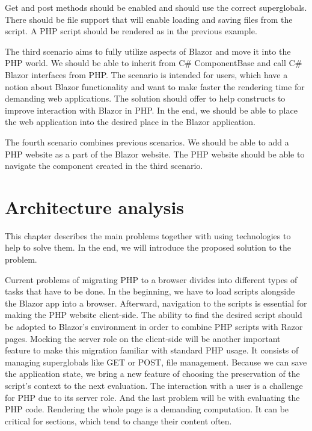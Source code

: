 Get and post methods should be enabled and should use the correct superglobals.
There should be file support that will enable loading and saving files from the script.
A PHP script should be rendered as in the previous example.
\par
The third scenario aims to fully utilize aspects of Blazor and move it into the PHP world.
We should be able to inherit from C\# ComponentBase and call C\# Blazor interfaces from PHP.
The scenario is intended for users, which have a notion about Blazor functionality and want to make faster the rendering time for demanding web applications.
The solution should offer to help constructs to improve interaction with Blazor in PHP.
In the end, we should be able to place the web application into the desired place in the Blazor application.
\par
The fourth scenario combines previous scenarios.
We should be able to add a PHP website as a part of the Blazor website.
The PHP website should be able to navigate the component created in the third scenario.

\section{Architecture analysis}










This chapter describes the main problems together with using technologies to help to solve them.
In the end, we will introduce the proposed solution to the problem.

Current problems of migrating PHP to a browser divides into different types of tasks that have to be done.
In the beginning, we have to load scripts alongside the Blazor app into a browser. 
Afterward, navigation to the scripts is essential for making the PHP website client-side.
The ability to find the desired script should be adopted to Blazor's environment in order to combine PHP scripts with Razor pages.
Mocking the server role on the client-side will be another important feature to make this migration familiar with standard PHP usage.
It consists of managing superglobals like GET or POST, file management.
Because we can save the application state, we bring a new feature of choosing the preservation of the script's context to the next evaluation.
The interaction with a user is a challenge for PHP due to its server role.
And the last problem will be with evaluating the PHP code.
Rendering the whole page is a demanding computation.
It can be critical for sections, which tend to change their content often.
 
